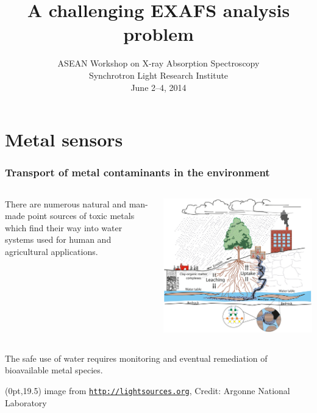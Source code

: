 \documentclass[10pt, xcolor=x11names, compress]{beamer}
\title{A challenging EXAFS analysis problem}
\date[ACXAS 2014]{ASEAN Workshop on X-ray Absorption Spectroscopy\\
  Synchrotron Light Research Institute\\June 2--4, 2014}
\begin{document}
\maketitle


\section{Metal sensors}

\begin{frame}
  \frametitle{Transport of metal contaminants in the environment}

  \begin{columns}
    \begin{column}{0.5\linewidth}
      There are numerous natural and man-made point sources of toxic
      metals which find their way into water systems used for human
      and agricultural applications.
    \end{column}
    \begin{column}{0.5\linewidth}
      \includegraphics[width=\linewidth]{images/APS016h_sm.jpg}      
    \end{column}
  \end{columns}

  \bigskip

  \begin{exampleblock}{}
    \begin{center}
      The safe use of water requires \alert{monitoring} and eventual
      remediation of bioavailable metal species.
    \end{center}
  \end{exampleblock}

  \begin{textblock*}{0.7\linewidth}(0pt,19.5\TPVertModule)
    \tiny image from \href{http://lightsources.org}
    {\color{Blue4}\texttt{http://lightsources.org}},
    Credit: Argonne National Laboratory
  \end{textblock*}
\end{frame}
\end{document}
